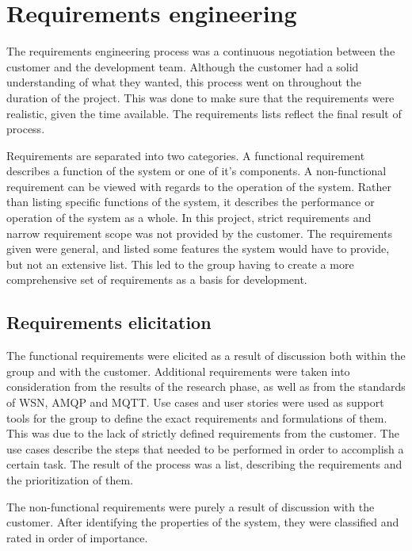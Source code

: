 
\chapter{Requirements engineering}
\label{ch:requirements_engineering}

The requirements engineering process was a continuous negotiation between the customer and the development team. Although the customer had a solid understanding of what they wanted, this process went on throughout the duration of the project. This was done to make sure that the requirements were realistic, given the time available. The requirements lists reflect the final result of process.

Requirements are separated into two categories. A functional requirement describes a function of the system or one of it's components. A non-functional requirement can be viewed with regards to the operation of the system. Rather than listing specific functions of the system, it describes the performance or operation of the system as a whole. In this project, strict requirements and narrow requirement scope was not provided by the customer. The requirements given were general, and listed some features the system would have to provide, but not an extensive list. This led to the group having to create a more comprehensive set of requirements as a basis for development.

\section{Requirements elicitation}
\label{sec:requirements_engineering-requirements_elicitation}

The functional requirements were elicited as a result of discussion both within the group and with the customer. Additional requirements were taken into consideration from the results of the research phase, as well as from the standards of WSN, AMQP and MQTT. Use cases and user stories were used as support tools for the group to define the exact requirements and formulations of them. This was due to the lack of strictly defined requirements from the customer. The use cases describe the steps that needed to be performed in order to accomplish a certain task. The result of the process was a list, describing the requirements and the prioritization of them.

The non-functional requirements were purely a result of discussion with the customer. After identifying the properties of the system, they were classified and rated in order of importance.

